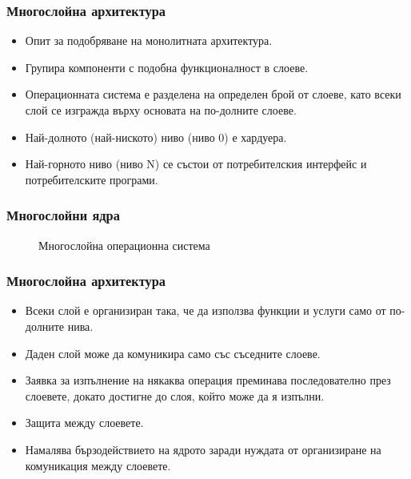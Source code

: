 \documentclass[ignorenonframetext, hyperref=unicode]{beamer}
\begin{document}
\begin{frame}
\frametitle{Многослойна архитектура}
\begin{itemize}
\item Опит за подобряване на монолитната архитектура.
\item Групира компоненти с подобна функционалност в слоеве.
\item Операционната система е разделена на определен брой от слоеве, като всеки
слой се изгражда върху основата на по-долните слоеве.
\item Най-долното (най-ниското) ниво (ниво 0) е хардуера.
\item Най-горното ниво (ниво N) се състои от потребителския интерфейс и
потребителските програми.
\end{itemize}
\end{frame}

\begin{frame}
\frametitle{Многослойни ядра}
\begin{figure}[h]
\center
{}
\caption{Многослойна операционна система}
\end{figure}
\end{frame}

\begin{frame}
\frametitle{Многослойна архитектура}
\begin{itemize}
\item Всеки слой е организиран така, че да използва функции и услуги само от
по-долните нива.
\item Даден слой може да комуникира само със съседните слоеве.
\item Заявка за изпълнение на някаква операция преминава последователно през
слоевете, докато достигне до слоя, който може да я изпълни.
\item Защита между слоевете.
\item Намалява бързодействието на ядрото заради нуждата от организиране на
комуникация между слоевете.
\end{itemize}
\end{frame}
\end{document}
